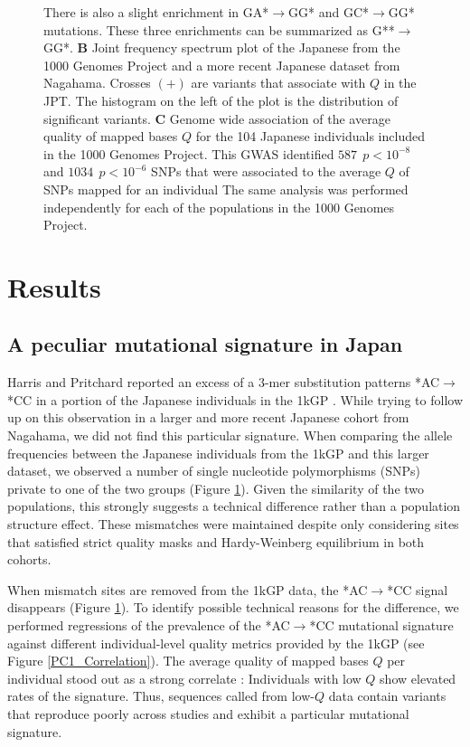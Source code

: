 \documentclass[9pt,lineno]{template}
\begin{document}
\begin{figure}
{There is also a slight enrichment in GA*${\rightarrow}$GG* and GC*${\rightarrow}$GG* mutations. 
These three enrichments can be summarized as G**${\rightarrow}$GG*. \textbf{B} 
Joint frequency spectrum plot of the Japanese from the 1000 Genomes Project and a more recent Japanese dataset from Nagahama.
Crosses $(+)$ are variants that associate with $Q$ in the JPT. 
The histogram on the left of the plot is the distribution of significant variants. 
\textbf{C} 
Genome wide association of the average quality of mapped bases $Q$ for the 104 Japanese individuals included in the 1000 Genomes Project. 
This GWAS identified $587\ \  p < 10^{-8}$ and $1034\ \ p < 10^{-6}$ SNPs that were associated to the average $Q$ of SNPs mapped for an individual
The same analysis was performed independently for each of the populations in the 1000 Genomes Project.}
 \label{SFS}
\end{figure}


\section{Results}

			
\subsection{A peculiar mutational signature in Japan}			
	
Harris and Pritchard reported an excess of a 3-mer substitution patterns *AC${\rightarrow}$*CC in a portion of the Japanese individuals in the 1kGP \citep{Harris2017a}.
While trying to follow up on this observation in a larger and more recent Japanese cohort from Nagahama, we did not find this particular signature.
When comparing the allele frequencies between the Japanese individuals from the 1kGP and this larger dataset, we observed a number of single nucleotide polymorphisms (SNPs) private to one of the two groups (Figure \ref{SFS}).
Given the similarity of the two populations, this strongly suggests a technical difference rather than a population structure effect.
These mismatches were maintained despite only considering sites that satisfied strict quality masks and Hardy-Weinberg equilibrium in both cohorts.

When mismatch sites are removed from the 1kGP data, the  *AC${\rightarrow}$*CC signal disappears (Figure \ref{SFS}). To identify possible technical reasons for the difference, we performed regressions of the prevalence of the  *AC${\rightarrow}$*CC mutational signature against different individual-level quality metrics provided by the 1kGP (see Figure \ref{PC1_Correlation}). 
The average quality of mapped bases  $Q$ per individual stood out as a strong correlate : Individuals with low $Q$ show elevated rates of the signature. 
Thus, sequences called from low-$Q$ data contain variants that reproduce poorly across studies and exhibit a particular mutational signature. 
\end{document}
